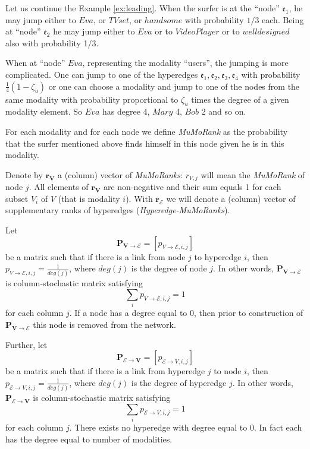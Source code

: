 \documentclass{fundam}
\newcommand{\HEM}{\mathcal{E}}
\newcommand{\hem}{\mathfrak{e}}
\newcommand{\N}{ V }
\begin{document}
\begin{example} %
    Let us continue the
Example \ref{ex:leading}.
When the surfer is at the ``node'' $\hem_1$, he may jump either to $Eva$, or $TVset$, or $handsome$ with probability $1/3$ each. Being  at ``node'' $\hem_2$ he may jump either to  $Eva$ or to $VideoPlayer$ or to  $welldesigned $ also with probability 1/3.

When at ``node'' $Eva$, representing the modality ``users'', the jumping is more complicated. One can jump to one of the hyperedges $\hem_1, \hem_2, \hem_3,\hem_4$  with probability $\frac 14 (1-\zeta_u)$ or  one can choose a modality and jump to one of the nodes from the same modality with probability proportional to $\zeta_u$ times the degree of a given modality element. So $Eva$ has degree 4, $Mary$ 4, $Bob$ 2 and so on.
\end{example}%

For each modality and for each node we define \emph{MuMoRank} as the probability that the surfer mentioned above finds himself in this node given he is in this modality.

Denote by $\mathbf{r_\N}$ a (column) vector of \emph{MuMoRanks}: $r_{\N,j}$ will mean the \emph{MuMoRank} of node $j$. All elements of $\mathbf{r_\N}$ are non-negative and their sum equals 1 for each subset $\N_i$ of $\N$ (that is modality $i$). With $\mathbf{r_{\HEM}}$ we will denote a (column) vector of supplementary ranks of hyperedges (\emph{Hyperedge-MuMoRanks}).

\medskip
Let
$$\mathbf{P_{\N\rightarrow \HEM}} = [p_{\N\rightarrow \HEM,i,j}]$$ be a matrix such that if there is a link from node $j$ to hyperedge $i$, then $p_{\N\rightarrow \HEM,i,j}=\frac{1}{deg(j)}$,
where $deg(j)$ is the  degree of node $j$.
In other words, $\mathbf{P_{\N\rightarrow \HEM}}$ is column-stochastic matrix satisfying $$\sum_i p_{\N\rightarrow \HEM,i,j} = 1$$ for each column $j$. If a node has a degree equal to 0, then prior to construction of $\mathbf{P_{\N\rightarrow \HEM}}$ this node is removed from the network.

\medskip
Further, let $$\mathbf{P_{\HEM\rightarrow \N}} = [p_{\HEM\rightarrow \N,i,j}]$$ be a matrix such that if there is a link from hyperedge $j$ to node $i$, then $p_{\HEM\rightarrow \N,i,j}=\frac{1}{deg(j)}$,
where $deg(j)$ is the degree of hyperedge $j$.
In other words, $\mathbf{P_{\HEM\rightarrow \N}}$ is column-stochastic matrix satisfying $$\sum_i p_{\HEM\rightarrow \N,i,j} = 1$$ for each column $j$. There exists no hyperedge  with  degree equal to 0.
In fact each has the degree equal to number of modalities.
\end{document}
